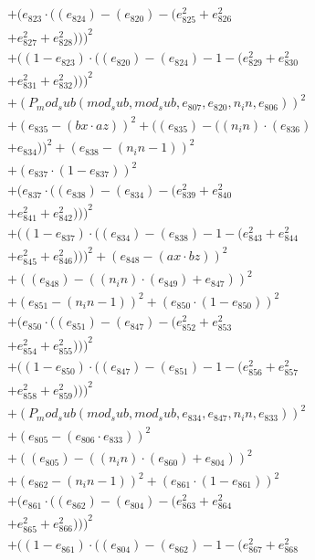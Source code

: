 \documentclass[10pt, a4paper]{article}
\begin{document}
\begin{align*}
& + (e_{823}  \cdot  ((e_{824}) - (e_{820}) - (e_{825}^{2} + e_{826}^{2} \\
& + e_{827}^{2} + e_{828}^{2})))^{2} \\
& + ((1 - e_{823})  \cdot  ((e_{820}) - (e_{824}) - 1 - (e_{829}^{2} + e_{830}^{2} \\
& + e_{831}^{2} + e_{832}^{2})))^{2} \\
& + (P_mod_sub(mod_sub, mod_sub, e_{807}, e_{820}, n_in, e_{806}))^{2} \\
& + (e_{835} - (bx  \cdot  az))^{2} + ((e_{835}) - ((n_in)  \cdot  (e_{836}) \\
& + e_{834}))^{2} + (e_{838} - (n_in - 1))^{2} \\
& + (e_{837}  \cdot  (1 - e_{837}))^{2} \\
& + (e_{837}  \cdot  ((e_{838}) - (e_{834}) - (e_{839}^{2} + e_{840}^{2} \\
& + e_{841}^{2} + e_{842}^{2})))^{2} \\
& + ((1 - e_{837})  \cdot  ((e_{834}) - (e_{838}) - 1 - (e_{843}^{2} + e_{844}^{2} \\
& + e_{845}^{2} + e_{846}^{2})))^{2} + (e_{848} - (ax  \cdot  bz))^{2} \\
& + ((e_{848}) - ((n_in)  \cdot  (e_{849}) + e_{847}))^{2} \\
& + (e_{851} - (n_in - 1))^{2} + (e_{850}  \cdot  (1 - e_{850}))^{2} \\
& + (e_{850}  \cdot  ((e_{851}) - (e_{847}) - (e_{852}^{2} + e_{853}^{2} \\
& + e_{854}^{2} + e_{855}^{2})))^{2} \\
& + ((1 - e_{850})  \cdot  ((e_{847}) - (e_{851}) - 1 - (e_{856}^{2} + e_{857}^{2} \\
& + e_{858}^{2} + e_{859}^{2})))^{2} \\
& + (P_mod_sub(mod_sub, mod_sub, e_{834}, e_{847}, n_in, e_{833}))^{2} \\
& + (e_{805} - (e_{806}  \cdot  e_{833}))^{2} \\
& + ((e_{805}) - ((n_in)  \cdot  (e_{860}) + e_{804}))^{2} \\
& + (e_{862} - (n_in - 1))^{2} + (e_{861}  \cdot  (1 - e_{861}))^{2} \\
& + (e_{861}  \cdot  ((e_{862}) - (e_{804}) - (e_{863}^{2} + e_{864}^{2} \\
& + e_{865}^{2} + e_{866}^{2})))^{2} \\
& + ((1 - e_{861})  \cdot  ((e_{804}) - (e_{862}) - 1 - (e_{867}^{2} + e_{868}^{2} \\

\end{align*}
\end{document}
